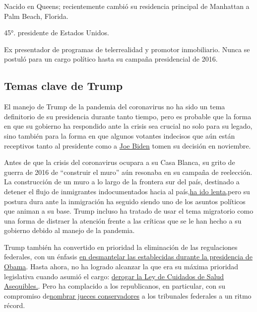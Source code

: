 Nacido en Queens; recientemente cambió su residencia principal de
Manhattan a Palm Beach, Florida.

45°. presidente de Estados Unidos.

Ex presentador de programas de telerrealidad y promotor inmobiliario.
Nunca se postuló para un cargo político hasta su campaña presidencial de
2016.

\hypertarget{temas-clave-de-trump}{%
\subsection{Temas clave de Trump}\label{temas-clave-de-trump}}

El manejo de Trump de la pandemia del coronavirus no ha sido un tema
definitorio de su presidencia durante tanto tiempo, pero es probable que
la forma en que su gobierno ha respondido ante la crisis sea crucial no
solo para su legado, sino también para la forma en que algunos votantes
indecisos que aún están receptivos tanto al presidente como a
\href{https://www.nytimes3xbfgragh.onion/interactive/2020/07/13/espanol/mundo/joe-biden-elecciones.html\%0A}{Joe
Biden} tomen su decisión en noviembre.

Antes de que la crisis del coronavirus ocupara a su Casa Blanca, su
grito de guerra de 2016 de ``construir el muro'' aún resonaba en su
campaña de reelección. La construcción de un muro a lo largo de la
frontera sur del país, destinado a detener el flujo de inmigrantes
indocumentados hacia al
país,\href{https://www.nytimes3xbfgragh.onion/2019/11/08/us/border-wall-texas.html}{ha
ido lenta,}pero su postura dura ante la inmigración ha seguido siendo
uno de los asuntos políticos que animan a su base. Trump incluso ha
tratado de usar el tema migratorio como una forma de distraer la
atención frente a las críticas que se le han hecho a su gobierno debido
al manejo de la pandemia.

Trump también ha convertido en prioridad la eliminación de las
regulaciones federales, con un énfasis
\href{https://www.nytimes3xbfgragh.onion/interactive/2019/climate/trump-environment-rollbacks.html}{en
desmantelar las establecidas durante la presidencia de Obama}. Hasta
ahora, no ha logrado alcanzar la que era su máxima prioridad legislativa
cuando asumió el cargo:
\href{https://www.nytimes3xbfgragh.onion/2019/05/01/health/unconstitutional-trump-aca.html}{derogar
la Ley de Cuidados de Salud Asequibles.}. Pero ha complacido a los
republicanos, en particular, con su compromiso
de\href{https://www.nytimes3xbfgragh.onion/2020/03/14/us/trump-appeals-court-judges.html}{nombrar
jueces conservadores} a los tribunales federales a un ritmo récord.

